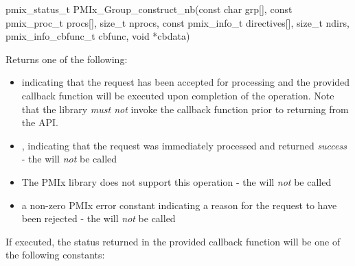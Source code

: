 \format

\cspecificstart
\begin{codepar}
pmix_status_t
PMIx_Group_construct_nb(const char grp[],
                        const pmix_proc_t procs[], size_t nprocs,
                        const pmix_info_t directives[], size_t ndirs,
                        pmix_info_cbfunc_t cbfunc, void *cbdata)
\end{codepar}
\cspecificend

\begin{arglist}
\end{arglist}

Returns one of the following:

\begin{itemize}
\item {} indicating that the request has been accepted for processing and the provided callback function will be executed upon completion of the operation. Note that the library \emph{must not} invoke the callback function prior to returning from the \ac{API}.
\item {}, indicating that the request was immediately processed and returned \textit{success} - the  will \textit{not} be called
\item {} The \ac{PMIx} library does not support this operation - the  will \textit{not} be called
\item a non-zero \ac{PMIx} error constant indicating a reason for the request to have been rejected - the  will \textit{not} be called
\end{itemize}

If executed, the status returned in the provided callback function will be one of the following constants:

